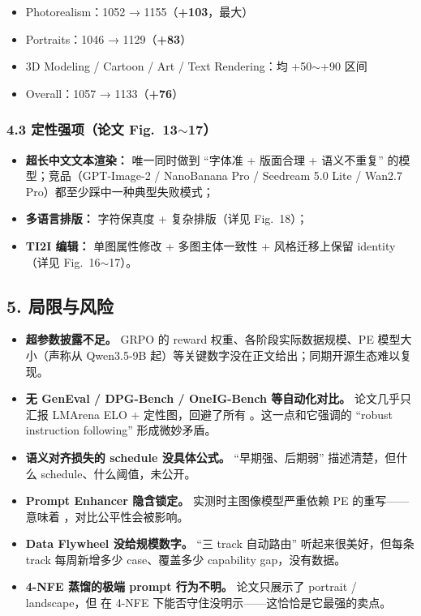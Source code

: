 \begin{itemize}[leftmargin=1.5em]
  \item Photorealism：1052 → 1155（\textbf{+103}，最大）
  \item Portraits：1046 → 1129（\textbf{+83}）
  \item 3D Modeling / Cartoon / Art / Text Rendering：均 +50$\sim$+90 区间
  \item Overall：1057 → 1133（\textbf{+76}）
\end{itemize}

\subsubsection{\texorpdfstring{4.3 定性强项（论文 Fig.~13$\sim$17）}{4.3 定性强项（论文 Fig. 13-17）}}

\begin{itemize}[leftmargin=1.5em]
  \item \textbf{超长中文文本渲染：} 唯一同时做到 ``字体准 + 版面合理 + 语义不重复'' 的模型；竞品（GPT-Image-2 / NanoBanana Pro / Seedream 5.0 Lite / Wan2.7 Pro）都至少踩中一种典型失败模式；
  \item \textbf{多语言排版：} 字符保真度 + 复杂排版（详见 Fig.~18）；
  \item \textbf{TI2I 编辑：} 单图属性修改 + 多图主体一致性 + 风格迁移上保留 identity（详见 Fig.~16$\sim$17）。
\end{itemize}

\subsection{5. 局限与风险}

\begin{itemize}[leftmargin=1.5em]
  \item \textbf{超参数披露不足。} GRPO 的 reward 权重、各阶段实际数据规模、PE 模型大小（声称从 Qwen3.5-9B 起）等关键数字没在正文给出；同期开源生态难以复现。
  \item \textbf{无 GenEval / DPG-Bench / OneIG-Bench 等自动化对比。} 论文几乎只汇报 LMArena ELO + 定性图，回避了所有 。这一点和它强调的 ``robust instruction following'' 形成微妙矛盾。
  \item \textbf{语义对齐损失的 schedule 没具体公式。} ``早期强、后期弱'' 描述清楚，但什么 schedule、什么阈值，未公开。
  \item \textbf{Prompt Enhancer 隐含锁定。} 实测时主图像模型严重依赖 PE 的重写——意味着 ，对比公平性会被影响。
  \item \textbf{Data Flywheel 没给规模数字。} ``三 track 自动路由'' 听起来很美好，但每条 track 每周新增多少 case、覆盖多少 capability gap，没有数据。
  \item \textbf{4-NFE 蒸馏的极端 prompt 行为不明。} 论文只展示了 portrait / landscape，但  在 4-NFE 下能否守住没明示——这恰恰是它最强的卖点。
\end{itemize}

